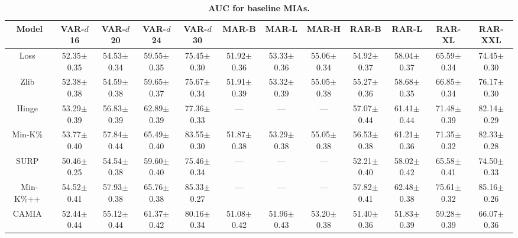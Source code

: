 \begin{table}[h!]
\centering
\tiny
\caption{\textbf{AUC for baseline MIAs.}}
\setlength{\tabcolsep}{3pt}
\begin{tabular}{cccccccccccc}
\toprule
        Model & VAR-$\mathit{d}$16 & VAR-$\mathit{d}$20 & VAR-$\mathit{d}$24 & VAR-$\mathit{d}$30 & MAR-B & MAR-L & MAR-H & RAR-B & RAR-L & RAR-XL & RAR-XXL \\
\midrule
Loss~\citep{yeom2018lossmia} & 52.35{\tiny $\pm$0.35} & 54.53{\tiny $\pm$0.34} & 59.55{\tiny $\pm$0.35} & 75.45{\tiny $\pm$0.30} & 51.92{\tiny $\pm$0.36} & 53.33{\tiny $\pm$0.36} & 55.06{\tiny $\pm$0.34} & 54.92{\tiny $\pm$0.37} & 58.04{\tiny $\pm$0.37} & 65.59{\tiny $\pm$0.34} & 74.45{\tiny $\pm$0.30} \\
Zlib~\citep{carlini2021extractLLM} & 52.38{\tiny $\pm$0.38} & 54.59{\tiny $\pm$0.38} & 59.65{\tiny $\pm$0.37} & 75.67{\tiny $\pm$0.34} & 51.91{\tiny $\pm$0.39} & 53.32{\tiny $\pm$0.39} & 55.05{\tiny $\pm$0.38} & 55.27{\tiny $\pm$0.36} & 58.68{\tiny $\pm$0.35} & 66.85{\tiny $\pm$0.34} & 76.17{\tiny $\pm$0.30} \\
Hinge~\citep{bertran2024scalable} & 53.29{\tiny $\pm$0.39} & 56.83{\tiny $\pm$0.39} & 62.89{\tiny $\pm$0.39} & 77.36{\tiny $\pm$0.33} & --- & --- & --- & 57.07{\tiny $\pm$0.44} & 61.41{\tiny $\pm$0.44} & 71.48{\tiny $\pm$0.39} & 82.14{\tiny $\pm$0.29} \\
Min-K\%~\citep{shi2024detecting} & 53.77{\tiny $\pm$0.40} & 57.84{\tiny $\pm$0.44} & 65.49{\tiny $\pm$0.40} & 83.55{\tiny $\pm$0.30} & 51.87{\tiny $\pm$0.38} & 53.29{\tiny $\pm$0.38} & 55.05{\tiny $\pm$0.38} & 56.53{\tiny $\pm$0.38} & 61.21{\tiny $\pm$0.36} & 71.35{\tiny $\pm$0.32} & 82.33{\tiny $\pm$0.28} \\
SURP~\citep{zhang2024adaptive} & 50.46{\tiny $\pm$0.25} & 54.54{\tiny $\pm$0.38} & 59.60{\tiny $\pm$0.40} & 75.46{\tiny $\pm$0.34} & --- & --- & --- & 52.21{\tiny $\pm$0.40} & 58.02{\tiny $\pm$0.42} & 65.58{\tiny $\pm$0.41} & 74.50{\tiny $\pm$0.33} \\
Min-K\%++~\citep{zhang2024min} & 54.52{\tiny $\pm$0.41} & 57.93{\tiny $\pm$0.38} & 65.76{\tiny $\pm$0.38} & 85.33{\tiny $\pm$0.27} & --- & --- & --- & 57.82{\tiny $\pm$0.41} & 62.48{\tiny $\pm$0.38} & 75.61{\tiny $\pm$0.32} & 85.16{\tiny $\pm$0.26} \\
CAMIA~\citep{chang2024context} & 52.44{\tiny $\pm$0.44} & 55.12{\tiny $\pm$0.44} & 61.37{\tiny $\pm$0.42} & 80.16{\tiny $\pm$0.34} & 51.08{\tiny $\pm$0.42} & 51.96{\tiny $\pm$0.43} & 53.20{\tiny $\pm$0.38} & 51.40{\tiny $\pm$0.36} & 51.83{\tiny $\pm$0.39} & 59.28{\tiny $\pm$0.39} & 66.07{\tiny $\pm$0.36} \\

\bottomrule
\end{tabular}
\label{tab:auc_baseline_mias}
\end{table}



